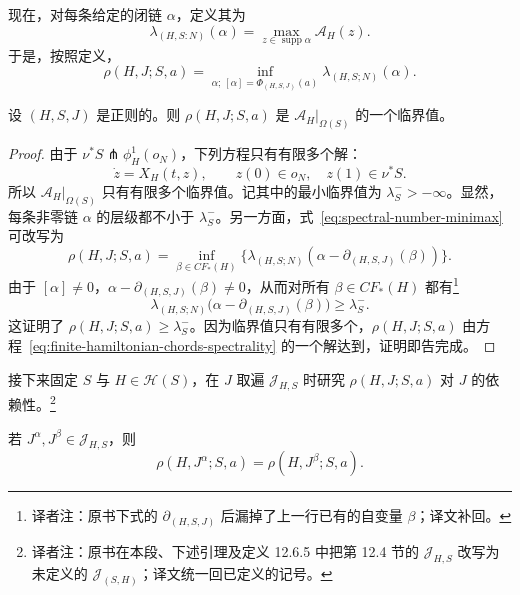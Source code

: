 现在，对每条给定的\personFloer{}闭链 $\alpha$，定义其\termActionLevel{}为
\[
  \lambda_{(H,S:N)}(\alpha)
  =\max_{z\in\operatorname{supp}\alpha}\mathcal A_H(z).
\]
于是，按照定义，
\begin{equation}
  \rho(H,J;S,a)
  =\inf_{\alpha;\,[\alpha]=\Phi_{(H,S,J)}(a)}
    \lambda_{(H,S;N)}(\alpha).
\label{eq:spectral-number-minimax}
\end{equation}

\begin{lemma}
\label{lem:spectrality-regular-data}
设 $(H,S,J)$ 是\personFloer{}正则的。则 $\rho(H,J;S,a)$ 是 $\mathcal A_H|_{\Omega(S)}$ 的一个临界值。
\end{lemma}

\begin{proof}
由于 $\nu^*S\pitchfork\phi_H^1(o_N)$，下列方程只有有限多个解：
\begin{equation}
  \dot z=X_H(t,z),
  \qquad
  z(0)\in o_N,
  \quad z(1)\in\nu^*S.
\label{eq:finite-hamiltonian-chords-spectrality}
\end{equation}
所以 $\mathcal A_H|_{\Omega(S)}$ 只有有限多个临界值。记其中的最小临界值为 $\lambda_S^->-\infty$。显然，每条非零\personFloer{}链 $\alpha$ 的层级都不小于 $\lambda_S^-$。另一方面，式~\eqref{eq:spectral-number-minimax} 可改写为
\[
  \rho(H,J;S,a)
  =\inf_{\beta\in CF_*(H)}
  \{\lambda_{(H,S;N)}(\alpha-\partial_{(H,S,J)}(\beta))\}.
\]
由于 $[\alpha]\ne0$，$\alpha-\partial_{(H,S,J)}(\beta)\ne0$，从而对所有 $\beta\in CF_*(H)$ 都有\footnote{译者注：原书下式的 $\partial_{(H,S,J)}$ 后漏掉了上一行已有的自变量 $\beta$；译文补回。}
\[
  \lambda_{(H,S;N)}
  \bigl(\alpha-\partial_{(H,S,J)}(\beta)\bigr)
  \ge\lambda_S^-.
\]
这证明了 $\rho(H,J;S,a)\ge\lambda_S^-$。因为临界值只有有限多个，$\rho(H,J;S,a)$ 由方程~\eqref{eq:finite-hamiltonian-chords-spectrality} 的一个解达到，证明即告完成。
\end{proof}

接下来固定 $S$ 与 $H\in\mathcal H(S)$，在 $J$ 取遍 $\mathcal J_{H,S}$ 时研究 $\rho(H,J;S,a)$ 对 $J$ 的依赖性。\footnote{译者注：原书在本段、下述引理及定义 12.6.5 中把第 12.4 节的 $\mathcal J_{H,S}$ 改写为未定义的 $\mathcal J_{(S,H)}$；译文统一回已定义的记号。}

\begin{lemma}
\label{lem:spectral-number-independent-of-j}
若 $J^\alpha,J^\beta\in\mathcal J_{H,S}$，则
\[
  \rho(H,J^\alpha;S,a)=\rho(H,J^\beta;S,a).
\]
\end{lemma}

